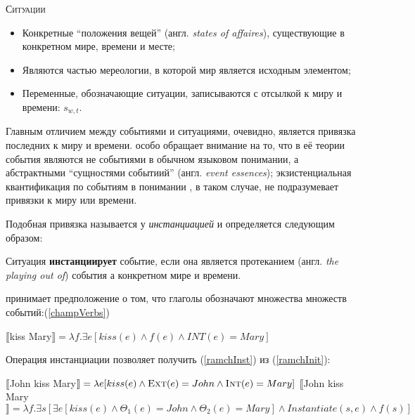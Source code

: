 \documentclass[a4paper, titlepage]{article}
\begin{document}
\begin{exe}
    \ex \textsc{Ситуации}
        \begin{itemize}
            \item Конкретные ``положения вещей'' (англ. \textit{states of affaires}), существующие в конкретном мире, времени и месте;
            \item Являются частью мереологии, в которой мир является исходным  элементом;
            \item Переменные, обозначающие ситуации, записываются с отсылкой к миру и времени: $ s_{w, t} $.
        \end{itemize}
\end{exe}

Главным отличием между событиями и ситуациями, очевидно, является привязка последних к миру и времени. \citep{ramchand201Xauxiliaries} особо обращает внимание на то, что в её теории события являются не событиями в обычном языковом понимании, а абстрактными ``сущностями событиий'' (англ. \textit{event essences}); экзистенциальная квантификация по событиям в понимании \citep{ramchand201Xauxiliaries}, в таком случае, не подразумевает привязки к миру или времени.

\medskip

Подобная привязка называется у \citep{ramchand201Xauxiliaries} \textit{инстанциацией} и определяется следующим образом:

\begin{exe}
    \ex Ситуация \textbf{инстанциирует} событие, если она является протеканием (англ. \textit{the playing out of}) события а конкретном мире и времени.
\end{exe}

\citep{ramchand201Xauxiliaries} принимает предположение \citep{champollion2015interaction} о том, что глаголы обозначают множества множеств событий:(\ref{champVerbs})

\begin{exe}
    \ex \label{champVerbs} $\llbracket$kiss Mary$\rrbracket = \lambda f.\exists e[kiss(e) \land f(e) \land INT(e) = Mary]$
\end{exe}

Операция инстанциации позволяет получить (\ref{ramchInst}) из (\ref{ramchInit}):

\begin{exe}
    \ex \begin{xlist}
        \ex \label{ramchInit} $\llbracket$John kiss Mary$\rrbracket = \lambda e[kiss(e) \land \textsc{Ext}(e) = John \land \textsc{Int}(e) = Mary]$
        \ex \label{ramchInst} $\llbracket$John kiss Mary$\rrbracket = \lambda f.\exists s [ \exists e[kiss(e) \land \Theta_1(e) = John \land \Theta_2(e) = Mary] \land \textit{Instantiate}(s,e) \land f(s)]$
    \end{xlist}
\end{exe}
\end{document}
